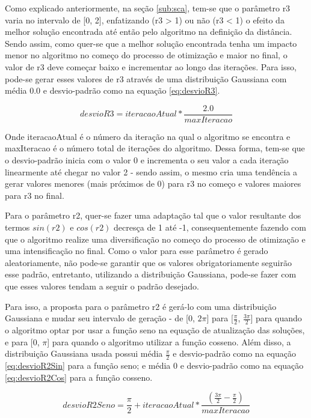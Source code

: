 Como explicado anteriormente, na seção \ref{sub:sca}, tem-se que o parâmetro r3 varia no intervalo de [0, 2], enfatizando (r3 > 1) ou não (r3 < 1) o efeito da melhor solução encontrada até então pelo algoritmo na definição da distância. Sendo assim, como quer-se que a melhor solução encontrada tenha um impacto menor no algoritmo no começo do processo de otimização e maior no final, o valor de r3 deve começar baixo e incrementar ao longo das iterações. Para isso, pode-se gerar esses valores de r3 através de uma distribuição Gaussiana com média 0.0 e desvio-padrão como na equação \ref{eq:desvioR3}.

\begin{equation}
    \label{eq:desvioR3}
    desvioR3 = iteracaoAtual * \frac{2.0}{maxIteracao}
\end{equation}

Onde iteracaoAtual é o número da iteração na qual o algoritmo se encontra e maxIteracao é o número total de iterações do algoritmo. Dessa forma, tem-se que o desvio-padrão inicia com o valor 0 e incrementa o seu valor a cada iteração linearmente até chegar no valor 2 - sendo assim, o mesmo cria uma tendência a gerar valores menores (mais próximos de 0) para r3 no começo e valores maiores para r3 no final.

Para o parâmetro r2, quer-se fazer uma adaptação tal que o valor resultante dos termos $sin(r2)$ e $cos(r2)$ decresça de 1 até -1, consequentemente fazendo com que o algoritmo realize uma diversificação no começo do processo de otimização e uma intensificação no final. Como o valor para esse parâmetro é gerado aleatoriamente, não pode-se garantir que os valores obrigatoriamente seguirão esse padrão, entretanto, utilizando a distribuição Gaussiana, pode-se fazer com que esses valores tendam a seguir o padrão desejado.

Para isso, a proposta para o parâmetro r2 é gerá-lo com uma distribuição Gaussiana e mudar seu intervalo de geração - de [0, $2\pi$] para [$\frac{\pi}{2}$, $\frac{3\pi}{2}$] para quando o algoritmo optar por usar a função seno na equação de atualização das soluções, e para [0, $\pi$] para quando o algoritmo utilizar a função cosseno. Além disso, a distribuição Gaussiana usada possui média $\frac{\pi}{2}$ e desvio-padrão como na equação \ref{eq:desvioR2Sin} para a função seno; e média 0 e desvio-padrão como na equação \ref{eq:desvioR2Cos} para a função cosseno.

\begin{equation}
    \label{eq:desvioR2Sin}
    desvioR2Seno = \frac{\pi}{2} + iteracaoAtual * \frac{(\frac{3\pi}{2}-\frac{\pi}{2})}{maxIteracao}
\end{equation}


